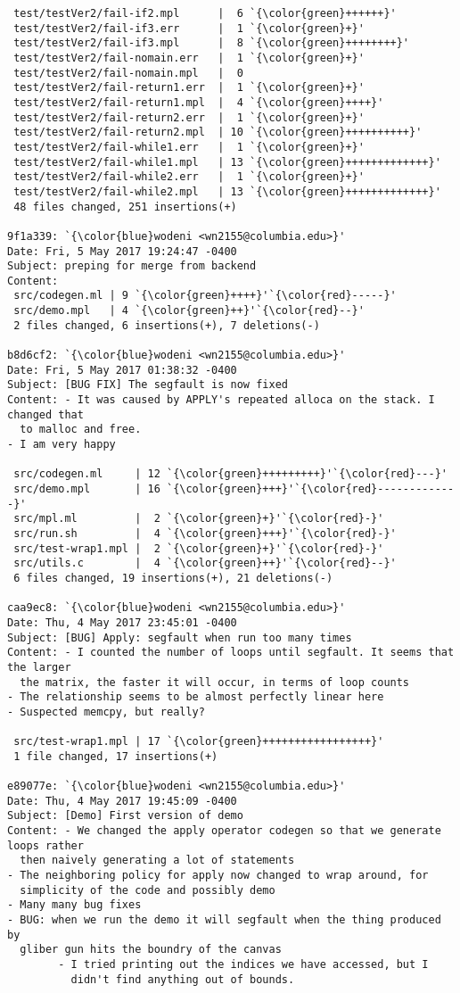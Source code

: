 \begin{lstlisting}
 test/testVer2/fail-if2.mpl      |  6 `{\color{green}++++++}'
 test/testVer2/fail-if3.err      |  1 `{\color{green}+}'
 test/testVer2/fail-if3.mpl      |  8 `{\color{green}++++++++}'
 test/testVer2/fail-nomain.err   |  1 `{\color{green}+}'
 test/testVer2/fail-nomain.mpl   |  0
 test/testVer2/fail-return1.err  |  1 `{\color{green}+}'
 test/testVer2/fail-return1.mpl  |  4 `{\color{green}++++}'
 test/testVer2/fail-return2.err  |  1 `{\color{green}+}'
 test/testVer2/fail-return2.mpl  | 10 `{\color{green}++++++++++}'
 test/testVer2/fail-while1.err   |  1 `{\color{green}+}'
 test/testVer2/fail-while1.mpl   | 13 `{\color{green}+++++++++++++}'
 test/testVer2/fail-while2.err   |  1 `{\color{green}+}'
 test/testVer2/fail-while2.mpl   | 13 `{\color{green}+++++++++++++}'
 48 files changed, 251 insertions(+)

9f1a339: `{\color{blue}wodeni <wn2155@columbia.edu>}'
Date: Fri, 5 May 2017 19:24:47 -0400
Subject: preping for merge from backend
Content: 
 src/codegen.ml | 9 `{\color{green}++++}'`{\color{red}-----}'
 src/demo.mpl   | 4 `{\color{green}++}'`{\color{red}--}'
 2 files changed, 6 insertions(+), 7 deletions(-)

b8d6cf2: `{\color{blue}wodeni <wn2155@columbia.edu>}'
Date: Fri, 5 May 2017 01:38:32 -0400
Subject: [BUG FIX] The segfault is now fixed
Content: - It was caused by APPLY's repeated alloca on the stack. I changed that
  to malloc and free.
- I am very happy

 src/codegen.ml     | 12 `{\color{green}+++++++++}'`{\color{red}---}'
 src/demo.mpl       | 16 `{\color{green}+++}'`{\color{red}-------------}'
 src/mpl.ml         |  2 `{\color{green}+}'`{\color{red}-}'
 src/run.sh         |  4 `{\color{green}+++}'`{\color{red}-}'
 src/test-wrap1.mpl |  2 `{\color{green}+}'`{\color{red}-}'
 src/utils.c        |  4 `{\color{green}++}'`{\color{red}--}'
 6 files changed, 19 insertions(+), 21 deletions(-)

caa9ec8: `{\color{blue}wodeni <wn2155@columbia.edu>}'
Date: Thu, 4 May 2017 23:45:01 -0400
Subject: [BUG] Apply: segfault when run too many times
Content: - I counted the number of loops until segfault. It seems that the larger
  the matrix, the faster it will occur, in terms of loop counts
- The relationship seems to be almost perfectly linear here
- Suspected memcpy, but really?

 src/test-wrap1.mpl | 17 `{\color{green}+++++++++++++++++}'
 1 file changed, 17 insertions(+)

e89077e: `{\color{blue}wodeni <wn2155@columbia.edu>}'
Date: Thu, 4 May 2017 19:45:09 -0400
Subject: [Demo] First version of demo
Content: - We changed the apply operator codegen so that we generate loops rather
  then naively generating a lot of statements
- The neighboring policy for apply now changed to wrap around, for
  simplicity of the code and possibly demo
- Many many bug fixes
- BUG: when we run the demo it will segfault when the thing produced by
  gliber gun hits the boundry of the canvas
        - I tried printing out the indices we have accessed, but I
          didn't find anything out of bounds.


\end{lstlisting}
